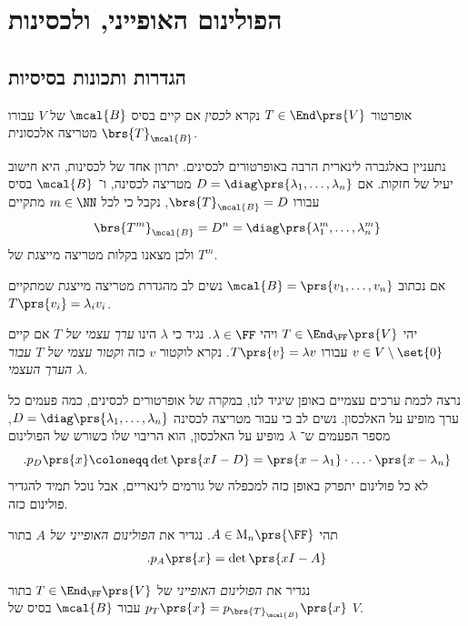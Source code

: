 \documentclass[a4paper,10pt,twoside,openany]{book}
\renewcommand{\Mat}{\mathrm{M}}
\begin{document}
\section{הפולינום האופייני, ולכסינות}

\subsection{הגדרות ותכונות בסיסיות}

\begin{definition}
אופרטור
$T \in \End\prs{V}$
נקרא
\emph{לכסין}
אם קיים בסיס
$\mcal{B}$
של
$V$
עבורו
$\brs{T}_{\mcal{B}}$
מטריצה אלכסונית.
\end{definition}

נתעניין באלגברה לינארית הרבה באופרטורים לכסינים. יתרון אחד של לכסינות, היא חישוב יעיל של חזקות. אם
$D = \diag\prs{\lambda_1, \ldots, \lambda_n}$
מטריצה לכסינה, ו־%
$\mcal{B}$
בסיס עבורו
$\brs{T}_{\mcal{B}} = D$,
נקבל כי לכל
$m \in \NN$
מתקיים
\[\brs{T^m}_{\mcal{B}} = D^n = \diag\prs{\lambda_1^m, \ldots, \lambda_n^m}\]
ולכן מצאנו בקלות מטריצה מייצגת של
$T^m$.

אם נכתוב
$\mcal{B} = \prs{v_1, \ldots, v_n}$
נשים לב מהגדרת מטריצה מייצגת שמתקיים
$T\prs{v_i} = \lambda_i v_i$.

\begin{definition}
יהי
$T \in \End_\FF\prs{V}$
ויהי
$\lambda \in \FF$.
נגיד כי
$\lambda$
הינו
\emph{ערך עצמי של
$T$}
אם קיים
$v \in V \setminus \set{0}$
עבורו
$T\prs{v} = \lambda v$.
נקרא לוקטור
$v$
כזה
\emph{וקטור עצמי של
$T$
עבור הערך העצמי
$\lambda$}.
\end{definition}

נרצה לכמת ערכים עצמיים באופן שיגיד לנו, במקרה של אופרטורים לכסינים, כמה פעמים כל ערך מופיע על האלכסון. נשים לב כי עבור מטריצה לכסינה
$D = \diag\prs{\lambda_1, \ldots, \lambda_n}$,
מספר הפעמים ש־%
$\lambda$
מופיע על האלכסון, הוא הריבוי שלו כשורש של הפולינום
\[\text{.} p_D\prs{x} \coloneqq \det\prs{xI - D} = \prs{x - \lambda_1} \cdot \ldots \cdot \prs{x - \lambda_n}\]
לא כל פולינום יתפרק באופן כזה למכפלה של גורמים לינאריים, אבל נוכל תמיד להגדיר פולינום כזה.

\begin{definition}
תהי
$A \in \Mat_n\prs{\FF}$.
נגדיר את
\emph{הפולינום האופייני של
$A$}
בתור
\begin{align*}
\text{.} p_A\prs{x} = \det\prs{x I - A}
\end{align*}

נגדיר את
\emph{הפולינום האופייני}
של
$T \in \End_\FF\prs{V}$
בתור
$p_T\prs{x} = p_{\brs{T}_{\mcal{B}}}\prs{x}$
עבור
$\mcal{B}$
בסיס של
$V$.
\end{definition}
\end{document}
